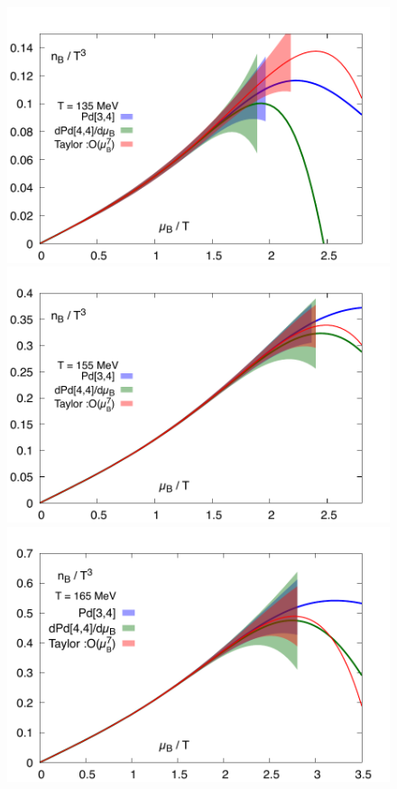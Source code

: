 \documentclass[pdflatex,prd,twocolumn,showpacs,superscriptaddress,nofootinbib]{revtex4-1}
\begin{document}
\begin{figure}[ht]
\includegraphics[scale=0.35]{fig/Pade_nB_T135.pdf}
\includegraphics[scale=0.35]{fig/Pade_nB_T155.pdf}
\includegraphics[scale=0.35]{fig/Pade_nB_T165.pdf}

\end{figure}
\end{document}
